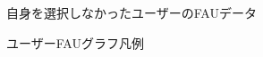 \begin{figure}[htbp]
    \begin{center}
    \end{center}
    \caption{自身を選択しなかったユーザーのFAUデータ}
    \label{fig:choose_else_for_paper}
\end{figure}

\begin{figure}[htbp]
    \begin{center}
    \end{center}
    \caption{ユーザーFAUグラフ凡例}
    \label{fig:usage_guide_fau}
\end{figure}

